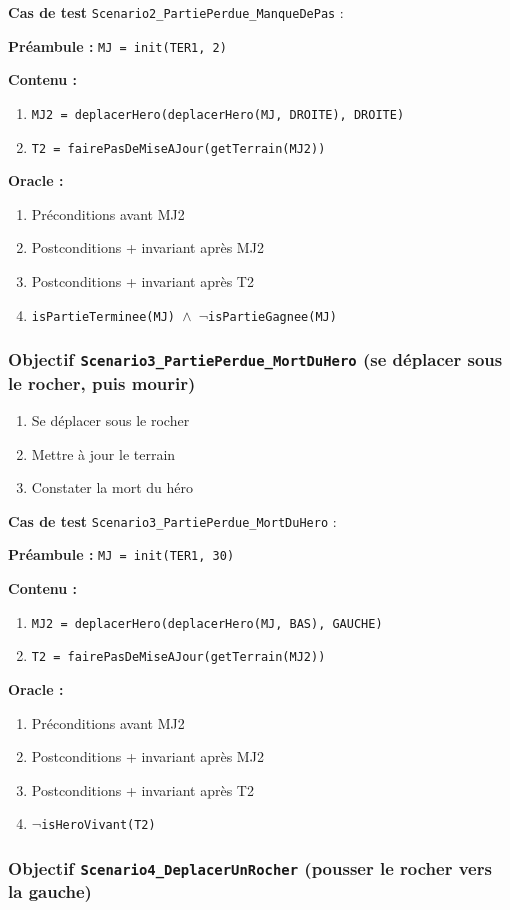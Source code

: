 \documentclass{article}
\newcommand{\cmd}[1]{\texttt{#1}}
\newcommand{\lAND}{$\land$}
\newcommand{\lNOT}{$\lnot$}
\newcommand{\obj}[2]{\subsubsection*{\large{\textbf{Objectif {\cmd{#1} (#2)}}}}}
\newenvironment{cas}[1]
{
	\hspace{1em}\textbf{Cas de test} \cmd{#1} :
	\begin{list}{}{}
}{
	\end{list}\vspace{1em}
}
\newcommand{\pre}[1]{\item \textbf{Préambule :} \cmd{#1}}
\newcommand{\oram}{\item \textbf{Oracle :}}
\newcommand{\opem}{\item \textbf{Contenu :}}
\begin{document}
	\begin{cas} {Scenario2\_PartiePerdue\_ManqueDePas}
		\pre{MJ = init(TER1, 2)}
		\opem{}
		\begin{enumerate}
			\item \cmd{MJ2 = deplacerHero(deplacerHero(MJ, DROITE), DROITE)}
			\item \cmd{T2 = fairePasDeMiseAJour(getTerrain(MJ2))}
		\end{enumerate}
		\oram{}
		\begin{enumerate}
			\item Préconditions avant MJ2
			\item Postconditions + invariant après MJ2
			\item Postconditions + invariant après T2
			\item \cmd{isPartieTerminee(MJ) \lAND{} \lNOT{}isPartieGagnee(MJ)}
		\end{enumerate}
	\end{cas}

\obj{Scenario3\_PartiePerdue\_MortDuHero} {se déplacer sous le rocher, puis mourir}

	\begin{enumerate}
		\item Se déplacer sous le rocher
		\item Mettre à jour le terrain
		\item Constater la mort du héro
	\end{enumerate}

	\begin{cas} {Scenario3\_PartiePerdue\_MortDuHero}
		\pre{MJ = init(TER1, 30)}
		\opem{}
		\begin{enumerate}
			\item \cmd{MJ2 = deplacerHero(deplacerHero(MJ, BAS), GAUCHE)}
			\item \cmd{T2 = fairePasDeMiseAJour(getTerrain(MJ2))}
		\end{enumerate}
		\oram{}
		\begin{enumerate}
			\item Préconditions avant MJ2
			\item Postconditions + invariant après MJ2
			\item Postconditions + invariant après T2
			\item \cmd{\lNOT{}isHeroVivant(T2)}
		\end{enumerate}
	\end{cas}

\obj{Scenario4\_DeplacerUnRocher} {pousser le rocher vers la gauche}
\end{document}
